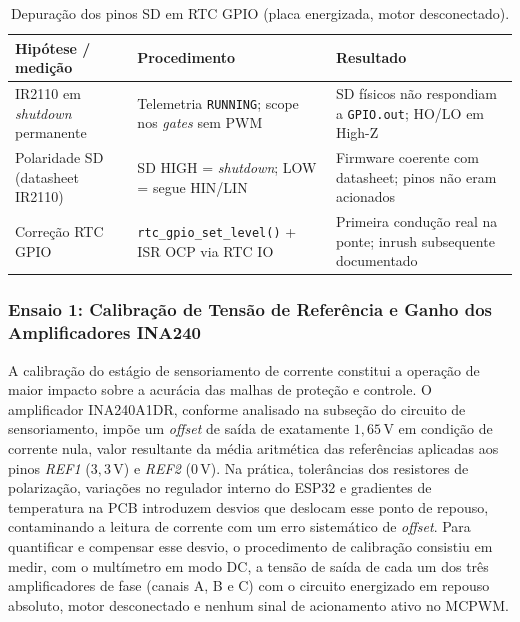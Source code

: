 \begin{table}[H]
    \centering
    \caption{Depuração dos pinos SD em RTC GPIO (placa energizada, motor desconectado).}
    \label{tab:depuracao_rtc_sd}
    \begin{tabular}{p{4.2cm}p{5.8cm}p{4.5cm}}
        \toprule
        \textbf{Hipótese / medição} & \textbf{Procedimento} & \textbf{Resultado} \\
        \midrule
        IR2110 em \textit{shutdown} permanente &
        Telemetria \texttt{RUNNING}; scope nos \textit{gates} sem PWM &
        SD físicos não respondiam a \texttt{GPIO.out}; HO/LO em High-Z \\
        Polaridade SD (datasheet IR2110) &
        SD HIGH = \textit{shutdown}; LOW = segue HIN/LIN &
        Firmware coerente com datasheet; pinos não eram acionados \\
        Correção RTC GPIO &
        \texttt{rtc\_gpio\_set\_level()} + ISR OCP via RTC IO &
        Primeira condução real na ponte; inrush subsequente documentado \\
        \bottomrule
    \end{tabular}
\end{table}



\subsubsection{Ensaio 1: Calibração de Tensão de Referência e Ganho dos Amplificadores INA240}

A calibração do estágio de sensoriamento de corrente constitui a operação de maior impacto sobre a acurácia das malhas de proteção e controle. O amplificador INA240A1DR, conforme analisado na subseção do circuito de sensoriamento, impõe um \textit{offset} de saída de exatamente $1{,}65\,\text{V}$ em condição de corrente nula, valor resultante da média aritmética das referências aplicadas aos pinos \textit{REF1} ($3{,}3\,\text{V}$) e \textit{REF2} ($0\,\text{V}$). Na prática, tolerâncias dos resistores de polarização, variações no regulador interno do ESP32 e gradientes de temperatura na PCB introduzem desvios que deslocam esse ponto de repouso, contaminando a leitura de corrente com um erro sistemático de \textit{offset}. Para quantificar e compensar esse desvio, o procedimento de calibração consistiu em medir, com o multímetro em modo DC, a tensão de saída de cada um dos três amplificadores de fase (canais A, B e C) com o circuito energizado em repouso absoluto, motor desconectado e nenhum sinal de acionamento ativo no MCPWM.


